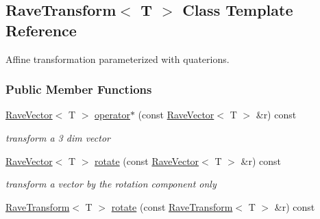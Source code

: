 \hypertarget{classOpenRAVE_1_1geometry_1_1RaveTransform}{
\subsection{RaveTransform$<$ T $>$ Class Template Reference}
\label{classOpenRAVE_1_1geometry_1_1RaveTransform}
}


Affine transformation parameterized with quaterions.  


\subsubsection*{Public Member Functions}
\begin{DoxyCompactItemize}
\item 
\hypertarget{classOpenRAVE_1_1geometry_1_1RaveTransform_a9fd0b1d5190b14e4c8a354b875103bfd}{
\hyperlink{classOpenRAVE_1_1geometry_1_1RaveVector}{RaveVector}$<$ T $>$ \hyperlink{classOpenRAVE_1_1geometry_1_1RaveTransform_a9fd0b1d5190b14e4c8a354b875103bfd}{operator$\ast$} (const \hyperlink{classOpenRAVE_1_1geometry_1_1RaveVector}{RaveVector}$<$ T $>$ \&r) const }
\label{classOpenRAVE_1_1geometry_1_1RaveTransform_a9fd0b1d5190b14e4c8a354b875103bfd}

\begin{DoxyCompactList}\small\item\em transform a 3 dim vector \item\end{DoxyCompactList}\item 
\hypertarget{classOpenRAVE_1_1geometry_1_1RaveTransform_a1a50fdbaa13ce6896da2e56679edf765}{
\hyperlink{classOpenRAVE_1_1geometry_1_1RaveVector}{RaveVector}$<$ T $>$ \hyperlink{classOpenRAVE_1_1geometry_1_1RaveTransform_a1a50fdbaa13ce6896da2e56679edf765}{rotate} (const \hyperlink{classOpenRAVE_1_1geometry_1_1RaveVector}{RaveVector}$<$ T $>$ \&r) const }
\label{classOpenRAVE_1_1geometry_1_1RaveTransform_a1a50fdbaa13ce6896da2e56679edf765}

\begin{DoxyCompactList}\small\item\em transform a vector by the rotation component only \item\end{DoxyCompactList}\item 
\hypertarget{classOpenRAVE_1_1geometry_1_1RaveTransform_ab62dd1c9c7281ec7662ae671341d0241}{
\hyperlink{classOpenRAVE_1_1geometry_1_1RaveTransform}{RaveTransform}$<$ T $>$ \hyperlink{classOpenRAVE_1_1geometry_1_1RaveTransform_ab62dd1c9c7281ec7662ae671341d0241}{rotate} (const \hyperlink{classOpenRAVE_1_1geometry_1_1RaveTransform}{RaveTransform}$<$ T $>$ \&r) const }
\label{classOpenRAVE_1_1geometry_1_1RaveTransform_ab62dd1c9c7281ec7662ae671341d0241}


\end{DoxyCompactItemize}

